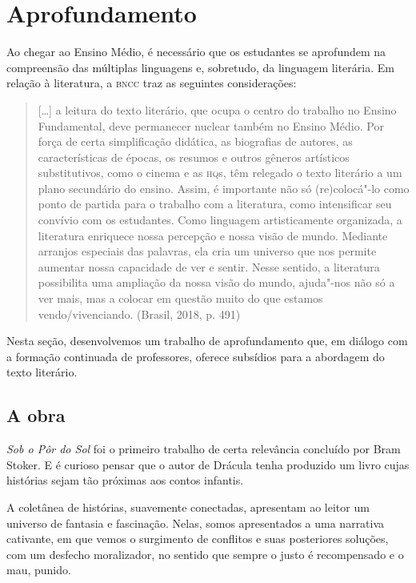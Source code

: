 \documentclass[12pt]{extarticle}
\begin{document}
\section{Aprofundamento}

Ao chegar ao Ensino Médio, é necessário que os estudantes se aprofundem
na compreensão das múltiplas linguagens e, sobretudo, da linguagem
literária. Em relação à literatura, a \textsc{bncc} traz as seguintes
considerações:

\begin{quote}
{[}\ldots{}{]} a leitura do texto literário, que ocupa o centro do trabalho
no Ensino Fundamental, deve permanecer nuclear também no Ensino Médio.
Por força de certa simplificação didática, as biografias de autores, as
características de épocas, os resumos e outros gêneros artísticos
substitutivos, como o cinema e as \textsc{hq}s, têm relegado o texto literário a
um plano secundário do ensino. Assim, é importante não só (re)colocá"-lo
como ponto de partida para o trabalho com a literatura, como
intensificar seu convívio com os estudantes. Como linguagem
artisticamente organizada, a literatura enriquece nossa percepção e
nossa visão de mundo. Mediante arranjos especiais das palavras, ela cria
um universo que nos permite aumentar nossa capacidade de ver e sentir.
Nesse sentido, a literatura possibilita uma ampliação da nossa visão do
mundo, ajuda"-nos não só a ver mais, mas a colocar em questão muito do
que estamos vendo/vivenciando. (Brasil, 2018, p. 491)
\end{quote}

Nesta seção, desenvolvemos um trabalho de aprofundamento que, em diálogo
com a formação continuada de professores, oferece subsídios para a
abordagem do texto literário.

\subsection{A obra}

\emph{Sob o Pôr do Sol} foi o primeiro trabalho de certa relevância
concluído por Bram Stoker. E é curioso pensar que o autor de Drácula
tenha produzido um livro cujas histórias sejam tão próximas aos contos
infantis.

A coletânea de histórias, suavemente conectadas, apresentam ao leitor um
universo de fantasia e fascinação. Nelas, somos apresentados a uma
narrativa cativante, em que vemos o surgimento de conflitos e suas
posteriores soluções, com um desfecho moralizador, no sentido que sempre
o justo é recompensado e o mau, punido.
\end{document}
